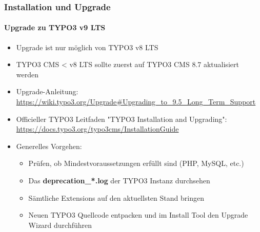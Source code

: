 \begin{frame}[fragile]
	\frametitle{Installation und Upgrade}
	\framesubtitle{Upgrade zu TYPO3 v9 LTS}

	\begin{itemize}
		\item Upgrade ist nur möglich von TYPO3 v8 LTS
		\item TYPO3 CMS < v8 LTS sollte zuerst auf TYPO3 CMS 8.7 aktualisiert werden
	\end{itemize}

	\begin{itemize}

		\item Upgrade-Anleitung:\newline
			\smaller\url{https://wiki.typo3.org/Upgrade#Upgrading_to_9.5_Long_Term_Support}\normalsize
		\item Officieller TYPO3 Leitfaden "TYPO3 Installation and Upgrading":
			\smaller\url{https://docs.typo3.org/typo3cms/InstallationGuide}\normalsize
		\item Generelles Vorgehen:
			\begin{itemize}
				\item Prüfen, ob Mindestvoraussetzungen erfüllt sind \small(PHP, MySQL, etc.)
				\item Das \textbf{deprecation\_*.log} der TYPO3 Instanz durchsehen
				\item Sämtliche Extensions auf den aktuellsten Stand bringen
				\item Neuen TYPO3 Quellcode entpacken und im Install Tool den Upgrade Wizard durchführen
			\end{itemize}
	\end{itemize}

\end{frame}

